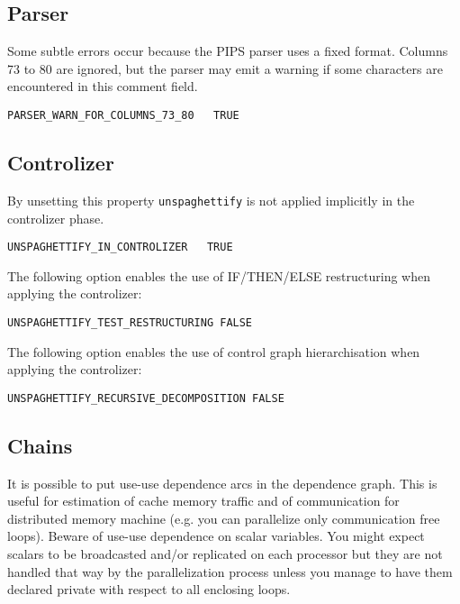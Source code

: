 \subsection{Parser}

Some subtle errors occur because the PIPS parser uses a fixed
format. Columns 73 to 80 are ignored, but the parser may emit a warning
if some characters are encountered in this comment field.

\begin{verbatim}
PARSER_WARN_FOR_COLUMNS_73_80   TRUE
\end{verbatim}


\subsection{Controlizer}

By unsetting this property \verb|unspaghettify| is not applied
implicitly in the controlizer phase.

\begin{verbatim}
UNSPAGHETTIFY_IN_CONTROLIZER   TRUE
\end{verbatim}

The following option enables the use of IF/THEN/ELSE restructuring
when applying the controlizer:
\begin{verbatim}
UNSPAGHETTIFY_TEST_RESTRUCTURING FALSE
\end{verbatim}

The following option enables the use of control graph hierarchisation
when applying the controlizer:
\begin{verbatim}
UNSPAGHETTIFY_RECURSIVE_DECOMPOSITION FALSE
\end{verbatim}



\subsection{Chains}

It is possible to put use-use dependence arcs in the dependence graph.
This is useful for estimation of cache memory traffic and of
communication for distributed memory machine (e.g. you can parallelize
only communication free loops). Beware of use-use dependence on scalar
variables. You might expect scalars to be broadcasted and/or replicated
on each processor but they are not handled that way by the
parallelization process unless you manage to have them
declared private with respect to all enclosing loops.

